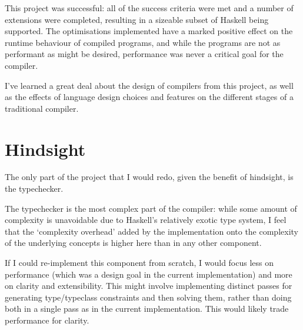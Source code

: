 \documentclass[dissertation.tex]{subfiles}
\begin{document}
This project was successful: all of the success criteria were met and a number of extensions were completed, resulting in a sizeable subset of Haskell being supported. The optimisations implemented have a marked positive effect on the runtime behaviour of compiled programs, and while the programs are not as performant as might be desired, performance was never a critical goal for the compiler.

I've learned a great deal about the design of compilers from this project, as well as the effects of language design choices and features on the different stages of a traditional compiler.

\section{Hindsight}
{
    The only part of the project that I would redo, given the benefit of hindsight, is the typechecker.

    The typechecker is the most complex part of the compiler: while some amount of complexity is unavoidable due to Haskell's relatively exotic type system, I feel that the `complexity overhead' added by the implementation onto the complexity of the underlying concepts is higher here than in any other component.

    If I could re-implement this component from scratch, I would focus less on performance (which was a design goal in the current implementation) and more on clarity and extensibility. This might involve implementing distinct passes for generating type/typeclass constraints and then solving them, rather than doing both in a single pass as in the current implementation. This would likely trade performance for clarity. 
}
\end{document}
